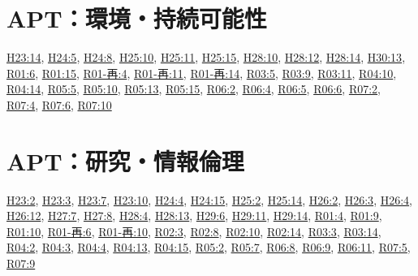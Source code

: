 \section{APT：環境・持続可能性}
\hyperref[q:h23-reg-apt-14]{H23:14}, \hyperref[q:h24-reg-apt-05]{H24:5}, \hyperref[q:h24-reg-apt-08]{H24:8}, \hyperref[q:h25-reg-apt-10]{H25:10}, \hyperref[q:h25-reg-apt-11]{H25:11}, \hyperref[q:h25-reg-apt-15]{H25:15}, \hyperref[q:h28-reg-apt-10]{H28:10}, \hyperref[q:h28-reg-apt-12]{H28:12}, \hyperref[q:h28-reg-apt-14]{H28:14}, \hyperref[q:h30-reg-apt-13]{H30:13}, \hyperref[q:r01-reg-apt-06]{R01:6}, \hyperref[q:r01-reg-apt-15]{R01:15}, \hyperref[q:r01-ret-apt-04]{R01-再:4}, \hyperref[q:r01-ret-apt-11]{R01-再:11}, \hyperref[q:r01-ret-apt-14]{R01-再:14}, \hyperref[q:r03-reg-apt-05]{R03:5}, \hyperref[q:r03-reg-apt-09]{R03:9}, \hyperref[q:r03-reg-apt-11]{R03:11}, \hyperref[q:r04-reg-apt-10]{R04:10}, \hyperref[q:r04-reg-apt-14]{R04:14}, \hyperref[q:r05-reg-apt-05]{R05:5}, \hyperref[q:r05-reg-apt-10]{R05:10}, \hyperref[q:r05-reg-apt-13]{R05:13}, \hyperref[q:r05-reg-apt-15]{R05:15}, \hyperref[q:r06-reg-apt-02]{R06:2}, \hyperref[q:r06-reg-apt-04]{R06:4}, \hyperref[q:r06-reg-apt-05]{R06:5}, \hyperref[q:r06-reg-apt-06]{R06:6}, \hyperref[q:r07-reg-apt-02]{R07:2}, \hyperref[q:r07-reg-apt-04]{R07:4}, \hyperref[q:r07-reg-apt-06]{R07:6}, \hyperref[q:r07-reg-apt-10]{R07:10}
\section{APT：研究・情報倫理}
\hyperref[q:h23-reg-apt-02]{H23:2}, \hyperref[q:h23-reg-apt-03]{H23:3}, \hyperref[q:h23-reg-apt-07]{H23:7}, \hyperref[q:h23-reg-apt-10]{H23:10}, \hyperref[q:h24-reg-apt-04]{H24:4}, \hyperref[q:h24-reg-apt-15]{H24:15}, \hyperref[q:h25-reg-apt-02]{H25:2}, \hyperref[q:h25-reg-apt-14]{H25:14}, \hyperref[q:h26-reg-apt-02]{H26:2}, \hyperref[q:h26-reg-apt-03]{H26:3}, \hyperref[q:h26-reg-apt-04]{H26:4}, \hyperref[q:h26-reg-apt-12]{H26:12}, \hyperref[q:h27-reg-apt-07]{H27:7}, \hyperref[q:h27-reg-apt-08]{H27:8}, \hyperref[q:h28-reg-apt-04]{H28:4}, \hyperref[q:h28-reg-apt-13]{H28:13}, \hyperref[q:h29-reg-apt-06]{H29:6}, \hyperref[q:h29-reg-apt-11]{H29:11}, \hyperref[q:h29-reg-apt-14]{H29:14}, \hyperref[q:r01-reg-apt-04]{R01:4}, \hyperref[q:r01-reg-apt-09]{R01:9}, \hyperref[q:r01-reg-apt-10]{R01:10}, \hyperref[q:r01-ret-apt-06]{R01-再:6}, \hyperref[q:r01-ret-apt-10]{R01-再:10}, \hyperref[q:r02-reg-apt-03]{R02:3}, \hyperref[q:r02-reg-apt-08]{R02:8}, \hyperref[q:r02-reg-apt-10]{R02:10}, \hyperref[q:r02-reg-apt-14]{R02:14}, \hyperref[q:r03-reg-apt-03]{R03:3}, \hyperref[q:r03-reg-apt-14]{R03:14}, \hyperref[q:r04-reg-apt-02]{R04:2}, \hyperref[q:r04-reg-apt-03]{R04:3}, \hyperref[q:r04-reg-apt-04]{R04:4}, \hyperref[q:r04-reg-apt-13]{R04:13}, \hyperref[q:r04-reg-apt-15]{R04:15}, \hyperref[q:r05-reg-apt-02]{R05:2}, \hyperref[q:r05-reg-apt-07]{R05:7}, \hyperref[q:r06-reg-apt-08]{R06:8}, \hyperref[q:r06-reg-apt-09]{R06:9}, \hyperref[q:r06-reg-apt-11]{R06:11}, \hyperref[q:r07-reg-apt-05]{R07:5}, \hyperref[q:r07-reg-apt-09]{R07:9}
